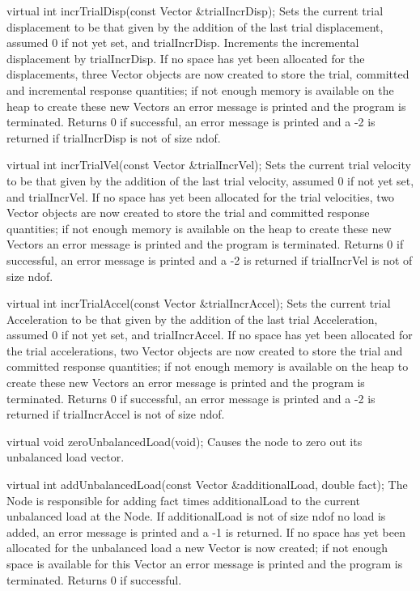  virtual int incrTrialDisp(const Vector &trialIncrDisp); 
Sets the current trial displacement to be that given by the addition
of the last trial displacement, assumed 0 if not yet set, and 
trialIncrDisp. Increments the incremental displacement by  trialIncrDisp.
If no space has yet been allocated for the displacements, three Vector objects 
are now created to store
the trial, committed and incremental response quantities; if not enough memory 
is available on the heap to create these new Vectors an error message
is printed and the program is terminated. Returns 0 if successful,
an error message is printed and a -2 is returned if 
trialIncrDisp is not of size  ndof. 

 virtual int incrTrialVel(const Vector &trialIncrVel); 
Sets the current trial velocity to be that given by the addition
of the last trial velocity, assumed 0 if not yet set, and 
trialIncrVel. If no space has yet been allocated for
the trial velocities, two Vector objects are now created to store
the trial and committed response quantities; if not enough memory 
is available on the heap to create these new Vectors an error message
is printed and the program is terminated. Returns 0 if successful,
an error message is printed and a -2 is returned if 
trialIncrVel is not of size  ndof. 

 virtual int incrTrialAccel(const Vector &trialIncrAccel); 
Sets the current trial Acceleration to be that given by the addition
of the last trial Acceleration, assumed 0 if not yet set, and
 trialIncrAccel.  If no space has yet been allocated for
the trial accelerations, two Vector objects are now created to store
the trial and committed response quantities; if not enough memory 
is available on the heap to create these new Vectors an error message
is printed and the program is terminated. Returns 0 if successful,
an error message is printed and a -2 is returned if 
trialIncrAccel is not of size  ndof. 

 virtual void zeroUnbalancedLoad(void); 
Causes the node to zero out its unbalanced load vector. 

 virtual int addUnbalancedLoad(const Vector &additionalLoad, double fact); 
The Node is responsible for adding  fact times 
additionalLoad to the current unbalanced load at the Node. If 
additionalLoad is not of size  ndof no load is added, an error
message is printed and a -1 is returned. If no space has yet been
allocated for the unbalanced load a new Vector is now created;  
if not enough space is available for this Vector an error message is
printed and the program is terminated. Returns 0 if successful.   

